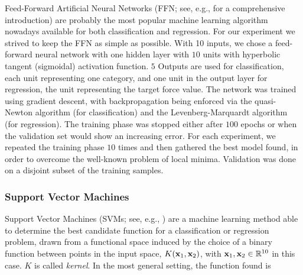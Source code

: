 Feed-Forward Artificial Neural Networks (FFN; see, e.g.,
\cite{bishop} for a comprehensive introduction) are probably the most
popular machine learning algorithm nowadays available for both
classification and regression. %
%
For our experiment we strived to keep the FFN as
simple as possible. With 10 inputs, we chose a feed-forward neural network with
one hidden layer with $10$ units with
hyperbolic tangent (sigmoidal) activation function.  $5$ Outputs are
used for classification, each unit representing one category,
and one unit in the output layer for regression, the unit representing
the target force value. The network was trained using gradient
descent, with backpropagation being enforced via the quasi-Newton
algorithm (for classification) and the Levenberg-Marquardt algorithm
(for regression). 
The training phase was stopped either after $100$ epochs
or when the validation set would show an increasing error. For each
experiment, we repeated the training phase $10$ times and then
gathered the best model found, in order to overcome the well-known
problem of local minima. Validation was done on a disjoint subset of
the training samples.

\subsubsection{Support Vector Machines}

Support Vector Machines (SVMs; see, e.g.,
\cite{BGV92,Burges98,Cristianini00}) are a machine learning method
able to determine the best candidate function for a classification or
regression problem, drawn from a functional space induced by the
choice of a binary function between points in the input space,
$K(\mathbf{x}_1,\mathbf{x}_2)$, with $\mathbf{x}_1, \mathbf{x}_2 \in \mathbb{R}^{10}$ in this case. $K$
is called \emph{kernel}. In the most general setting, the function
found is

